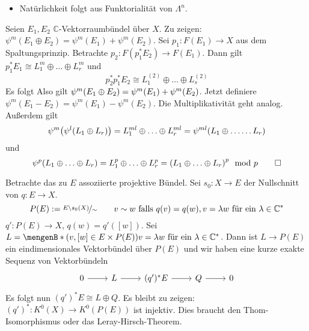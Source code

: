 \begin{beweis}[name=Existenz Adams Operation, 4.8]
\leavevmode
\begin{itemize}
	\item  Natürlichkeit folgt aus Funktorialität von $\Lambda^n$.
\end{itemize}
Seien $E_1, E_2$ $\mathds{C}$-Vektorraumbündel über $X$. Zu zeigen: $\psi^m(E_1 \oplus 	E_2) = \psi^m(E_1) + \psi^m(E_2)$. Sei $p_1 \colon F(E_1) \to X$ aus dem 
Spaltungsprinzip. Betrachte $p_2 \colon F(p_1^*E_2) \to F(E_1)$. Dann gilt $p_1^* E_1 \cong L^m_1 \oplus  \ldots \oplus L^m_r$ und
\[
	p_2^* p_1^* E_2 \cong L_1^{(2)} \oplus  \ldots \oplus L_s^{(2)}
\]
Es folgt 
Also gilt $\psi^m \enbrace*{E_1 \oplus E_2} = \psi^m(E_1) + \psi^m(E_2)$. Jetzt definiere $\psi^m(E_1 - E_2) = \psi^m(E_1) - \psi^m(E_2)$. Die Multiplikativität geht analog.
Außerdem gilt
\begin{align*}
	\psi^m \enbrace*{\psi^l \enbrace*{L_1 \oplus L_r} } = L_1^{ml} \oplus \ldots \oplus L_r^{ml} = \psi^{ml} \enbrace*{L_1 \oplus \ldots \ldots L_r}  
\end{align*}
und
\[
	\psi^p \enbrace*{L_1 \oplus \ldots \oplus L_r} = L_1^p \oplus \ldots \oplus L_r^p = \enbrace*{L_1 \oplus \ldots \oplus L_r}^p \mod p \qedhere 
\]
\end{beweis}

Betrachte das zu $E$ assoziierte projektive Bündel. Sei $s_0 \colon X \to E $ der Nullschnitt von $q \colon E \to X$.
\[
	P(E) := \nicefrac{E \setminus s_0(X)}{\sim} \qquad v \sim w \text{ falls } q(v)=q(w), v=\lambda w \text{ für ein } \lambda \in \mathds{C}^*
\]
$q' \colon P(E) \to X$, $q(w)= q'([w])$.
Sei $L= \set[{(v,[w] \in E \times P(E))}]{v=\lambda w \text{ für ein }\lambda \in \mathds{C}^*}$. Dann ist $L \to P(E)$ ein eindimensionales Vektorbündel über $P(E)$ und wir
haben eine kurze exakte Sequenz von Vektorbündeln
\[
	\begin{tikzcd}
		0 \rar & L \rar & (q')^* E \rar & Q \rar & 0
	\end{tikzcd}
\]
Es folgt nun $(q')^* E \cong L \oplus Q$. Es bleibt zu zeigen: $(q')^* \colon K^0(X) \to K^0(P(E))$ ist injektiv. Dies braucht den Thom-Isomorphismus oder das
Leray-Hirsch-Theorem.

